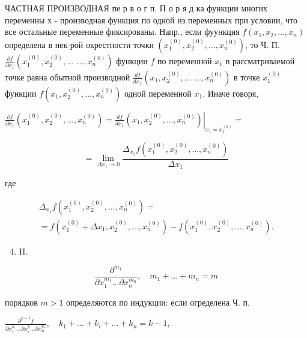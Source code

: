 \documentclass[10pt]{article}
\begin{document}
ЧАСТНАЯ ПРОИЗВОДНАЯ пе р в о г п. П о р я д ка функции многих переменны х - производная функция по одной из переменных при условии, что все остальные переменные фиксированы. Напр., если фуункция $f\left(x_{1}, x_{2}, \ldots, x_{n}\right)$ определена в нек-рой окрестности точки $\left(x_{1}^{(0)}, x_{2}^{(0)}, \ldots, x_{n}^{(0)}\right)$, то Ч. П. $\frac{\partial f}{\partial x_{1}}\left(x_{1}^{(0)}, x_{2}^{(0)}, \ldots\right.$ $\left.\ldots, x_{n}^{(0)}\right)$ функции $f$ по переменной $x_{1}$ в рассматриваемой точке равна обытной производной $\frac{d f}{d x_{1}}\left(x_{1}, x_{2}^{(0)}, \ldots\right.$ $\left.\ldots, x_{n}^{(0)}\right)$ в точке $x_{1}^{(0)}$ функции $f\left(x_{1}, x_{2}^{(0)}, \ldots, x_{n}^{(0)}\right)$ одной переменной $x_{1}$. Иначе говоря,



$\frac{\partial f}{\partial x_{1}}\left(x_{1}^{(0)}, x_{2}^{(0)}, \ldots, x_{n}^{(0)}\right)=\left.\frac{d f}{d x_{1}}\left(x_{1}, x_{2}^{(0)}, \ldots, x_{n}^{(0)}\right)\right|_{x_{1}=x_{1}^{(0)}}=$



\[

=\lim _{\Delta x_{1} \rightarrow 0} \frac{\Delta_{x_{1}} f\left(x_{1}^{(0)}, x_{2}^{(0)}, \ldots, x_{n}^{(0)}\right)}{\Delta x_{1}}

\]



где



\[

\begin{gathered}

\Delta_{x_{1}} f\left(x_{1}^{(0)}, x_{2}^{(0)}, \ldots, x_{n}^{(0)}\right)= \\

=f\left(x_{1}^{(0)}+\Delta x_{1}, x_{2}^{(0)}, \ldots, x_{n}^{(0)}\right)-f\left(x_{1}^{(0)}, x_{2}^{(0)}, \ldots, x_{n}^{(0)}\right) .

\end{gathered}

\]



\begin{enumerate}

  \setcounter{enumi}{3}

  \item II.

\end{enumerate}



\[

\frac{\partial^{m_{f}}}{\partial x_{1}^{m_{1}} \ldots \partial x_{n}^{m_{n}}}, \quad m_{1}+\ldots+m_{n}=m

\]



порядков $m>1$ определяются по индукции: если огределена Ч. п.



$\frac{\partial^{k-1} f}{\partial x_{1}^{k_{1}} \ldots \partial x_{i}^{k} \ldots \partial x_{n}^{k_{n}}}, \quad k_{1}+\ldots+k_{i}+\ldots+k_{n}=k-1$,
\end{document}
